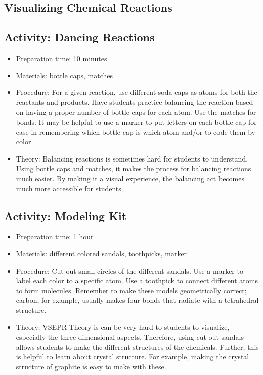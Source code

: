 \begin{itemize}
{\begin{itemize}
\begin{itemize}
{\section{Visualizing Chemical Reactions}

\subsection{Activity: Dancing Reactions}
\begin{itemize}
\item{Preparation time: 10 minutes}
\item{Materials: bottle caps, matches}
\item{Procedure: For a given reaction, use different soda caps as atoms for both the reactants and products. Have students practice balancing the reaction based on having a proper number of bottle caps for each atom. Use the matches for bonds. It may be helpful to use a marker to put letters on each bottle cap for ease in remembering which bottle cap is which atom and/or to code them by color.}
\item{Theory: Balancing reactions is sometimes hard for students to understand. Using bottle caps and matches, it makes the process for balancing reactions much easier. By making it a visual experience, the balancing act becomes much more accessible for students.}
\end{itemize}

\subsection{Activity: Modeling Kit}
\begin{itemize}
\item{Preparation time: 1 hour}
\item{Materials: different colored sandals, toothpicks, marker}
\item{Procedure: Cut out small circles of the different sandals. Use a marker to label each color to a specific atom. Use a toothpick to connect different atoms to form molecules. Remember to make these models geometrically correct; carbon, for example, usually makes four bonds that radiate with a tetrahedral structure.}
\item{Theory: VSEPR Theory is can be very hard to students to visualize, especially the three dimensional aspects. Therefore, using cut out sandals allows students to make the different structures of the chemicals. Further, this is helpful to learn about crystal structure. For example, making the crystal structure of graphite is easy to make with these.}
\end{itemize}

}
\end{itemize}
\end{itemize}}
\end{itemize}
